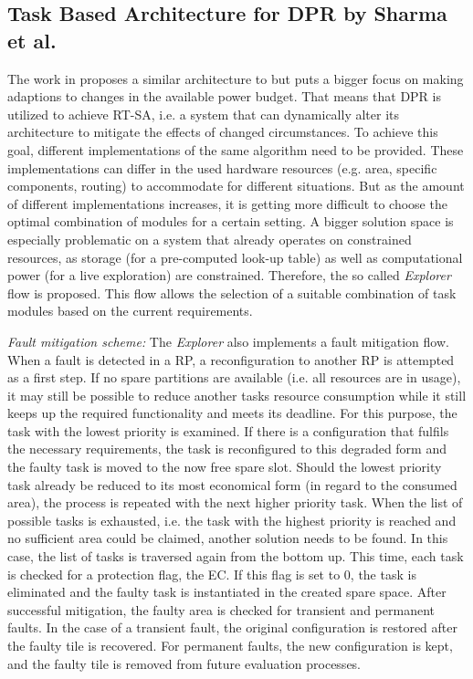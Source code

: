 \subsection{Task Based Architecture for \gls{DPR} by Sharma et al.}\label{sec:TaskBasedArchitectureSharma}
The work in \cite{sharma2018} proposes a similar architecture to \cite{wang_dynamic_2018} but puts a bigger focus on making adaptions to changes in the available power budget.
That means that \gls{DPR} is utilized to achieve \gls{RT-SA}, i.e. a system that can dynamically alter its architecture to mitigate the effects of changed circumstances.
To achieve this goal, different implementations of the same algorithm need to be provided.
These implementations can differ in the used hardware resources (e.g. area, specific components, routing) to accommodate for different situations.
But as the amount of different implementations increases, it is getting more difficult to choose the optimal combination of modules for a certain setting.
A bigger solution space is especially problematic on a system that already operates on constrained resources, as storage (for a pre-computed look-up table) as well as computational power (for a live exploration) are constrained. 
Therefore, the so called \textit{Explorer} flow is proposed.
This flow allows the selection of a suitable combination of task modules based on the current requirements.

\emph{Fault mitigation scheme:}
The \textit{Explorer} also implements a fault mitigation flow.
When a fault is detected in a \gls{RP}, a reconfiguration to another \gls{RP} is attempted as a first step.
If no spare partitions are available (i.e. all resources are in usage), it may still be possible to reduce another tasks resource consumption while it still keeps up the required functionality and meets its deadline.
For this purpose, the task with the lowest priority is examined.
If there is a configuration that fulfils the necessary requirements, the task is reconfigured to this degraded form and the faulty task is moved to the now free spare slot.
Should the lowest priority task already be reduced to its most economical form (in regard to the consumed area), the process is repeated with the next higher priority task. 
When the list of possible tasks is exhausted, i.e. the task with the highest priority is reached and no sufficient area could be claimed, another solution needs to be found. 
In this case, the list of tasks is traversed again from the bottom up. 
This time, each task is checked for a protection flag, the \gls{EC}. 
If this flag is set to 0, the task is eliminated and the faulty task is instantiated in the created spare space.
After successful mitigation, the faulty area is checked for transient and permanent faults. 
In the case of a transient fault, the original configuration is restored after the faulty tile is recovered. 
For permanent faults, the new configuration is kept, and the faulty tile is removed from future evaluation processes. 
